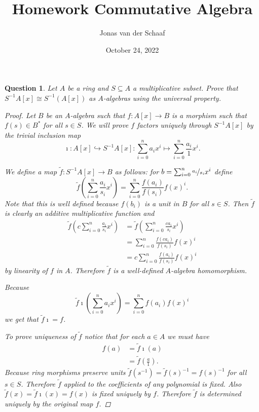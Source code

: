 \documentclass{article}
\title{Homework Commutative Algebra}
\author{Jonas van der Schaaf}
\date{October 24, 2022}
\newcommand{\incl}{\imath}
\newtheorem{question}{Question}
\theoremstyle{definition}
\begin{document}
\maketitle

\begin{question}
    Let \(A\) be a ring and \(S\subseteq A\) a multiplicative subset. Prove that
    \(S^{-1}A[x]\cong S^{-1}(A[x])\) as \(A\)-algebras using the universal
    property.

    \begin{proof}
        Let \(B\) be an \(A\)-algebra such that \(f:A[x]\to B\) is a morphism
        such that \(f(s)\in B^{*}\) for all \(s\in S\). We will prove \(f\)
        factors uniquely through \(S^{-1}A[x]\) by the trivial inclusion map
        \[
            \incl:A[x]\hookrightarrow S^{-1}A[x]:\sum_{i=0}^{n}a_{i}x^{i}\mapsto\sum_{i=0}^{n}\frac{a_{i}}{1}x^{i}.
        \]

        We define a map \(\tilde{f}:S^{-1}A[x]\to B\) as follows: for
        \(b=\sum_{i=0}^{n}\nicefrac{a_{i}}{s_{i}}x^{i}\) define
        \[
            \tilde{f}\left(\sum_{i=0}^{n}\frac{a_{i}}{s_{i}}x^{i}\right)=\sum_{i=0}^{n}\frac{f(a_{i})}{f(s_{i})}f(x)^{i}.
        \]
        Note that this is well defined because \(f(b_{i})\) is a unit in \(B\)
        for all \(s\in S\). Then \(\tilde{f}\) is clearly an additive
        multiplicative function and
        \begin{align*}
            \tilde{f}\left(c\sum_{i=0}^{n}\frac{a_{i}}{s_{i}}x^{i}\right) & =\tilde{f}\left(\sum_{i=0}^{n}\frac{ca_{i}}{s_{i}}x^{i}\right) \\
                                                                          & =\sum_{i=0}^{n}\frac{f(ca_{i})}{f(s_{i})}f(x)^{i}              \\
                                                                          & =c\sum_{i=0}^{n}\frac{f(a_{i})}{f(s_{i})}f(x)^{i}
        \end{align*}
        by linearity of \(f\) in \(A\).
        Therefore \(\tilde{f}\) is a well-defined \(A\)-algebra homomorphism.

        Because
        \[
            \tilde{f}\imath\left(\sum_{i=0}^{n}a_{i}x^{i}\right)=\sum_{i=0}^{n}f(a_{i})f(x)^{i}
        \]
        we get that \(\tilde{f}\imath=f\).

        To prove uniqueness of \(\tilde{f}\) notice that for each \(a\in A\) we
        must have
        \begin{align*}
            f(a) & =\tilde{f}\imath(a)                 \\
                 & =\tilde{f}\left(\frac{a}{1}\right).
        \end{align*}
        Because ring morphisms preserve units
        \(\tilde{f}(s^{-1})=\tilde{f}(s)^{-1}=f(s)^{-1}\) for all \(s\in S\).
        Therefore \(\tilde{f}\) applied to the coefficients of any polynomial is
        fixed. Also \(\tilde{f}(x)=\tilde{f}\imath(x)=f(x)\) is fixed uniquely
        by \(f\). Therefore \(\tilde{f}\) is determined uniquely by the original
        map \(f\).
    \end{proof}
\end{question}
\end{document}
